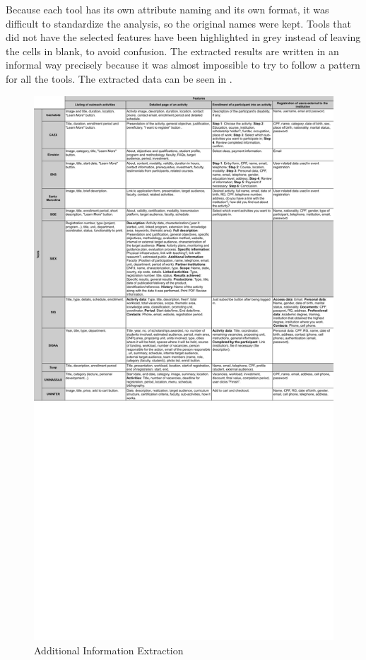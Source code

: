 Because each tool has its own attribute naming and its own format, it was difficult to standardize the analysis, so the original names were kept. Tools that did not have the selected features have been highlighted in grey instead of leaving the cells in blank, to avoid confusion. The extracted results are written in an informal way precisely because it was almost impossible to try to follow a pattern for all the tools. The extracted data can be seen in .

\begin{figure}[!htb]
  \caption{Additional Information Extraction}\label{fig:gl-additional-extraction}
  \begin{center}
    \includegraphics[width=16cm]{img/4-data-extraction-2.pdf}
  \end{center}
\end{figure}

